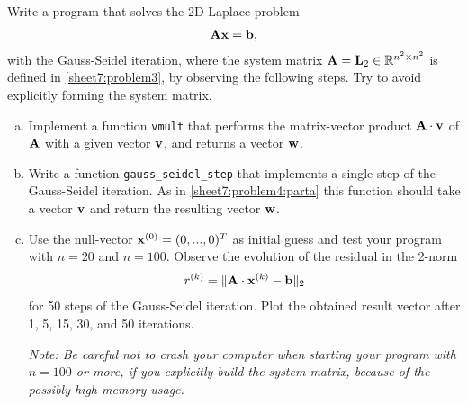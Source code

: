 \begin{Sheet}
  \begin{Problem}[Programming]
    Write a program that solves the 2D Laplace problem
    \begin{gather*}
      \mathbf A\mathbf x=\mathbf b,
    \end{gather*}
    with the Gauss-Seidel iteration, where the system matrix
    $\mathbf A=\mathbf L_2\in\mathbb R^{n^2\times n^2}$ is defined in
    \cref{sheet7:problem3}, by observing the following steps. Try to
    avoid explicitly forming the system matrix.
    \begin{enumerate}[(a)]
    \item\label{sheet7:problem4:parta} Implement a function
      \lstinline{vmult} that performs the matrix-vector product
      $\mathbf A\cdot\mathbf v$ of $\mathbf A$ with a given vector $\mathbf v$, and
      returns a vector $\mathbf w$.
    \item Write a function \lstinline{gauss_seidel_step} that
      implements a single step of the Gauss-Seidel iteration. As in
      \eqref{sheet7:problem4:parta} this function should take a vector
      $\mathbf v$ and return the resulting vector $\mathbf w$.
    \item Use the null-vector $\mathbf x^{(0)} = (0,...,0)^T$ as initial
      guess and test your program with $n=20$ and $n=100$. Observe the
      evolution of the residual in the 2-norm
      \begin{gather*}
        r^{(k)} = \lVert\mathbf A\cdot\mathbf x^{(k)}-\mathbf b\rVert_2
      \end{gather*}
      for 50 steps of the Gauss-Seidel iteration.  Plot the obtained
      result vector after 1, 5, 15, 30, and 50 iterations.

      \textit{Note: Be careful not to crash your computer when
        starting your program with $n=100$ or more, if you explicitly
        build the system matrix, because of the possibly high memory
        usage.}
    \end{enumerate}
  \end{Problem}

\end{Sheet}


